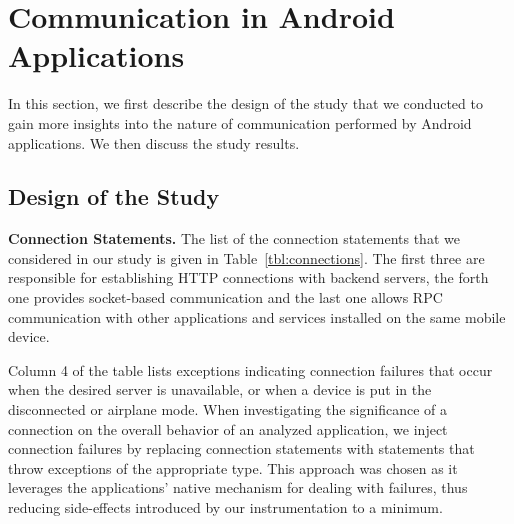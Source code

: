 \section{Communication in Android Applications}
\label{sec:study} 

In this section, we first describe the design of the study that we conducted to gain more insights into the nature of communication performed by Android applications. We then discuss the study results. 

\subsection{Design of the Study}

\vspace{0.1in}
\noindent 
{\bf Connection Statements.}
The list of the connection statements that we considered in our study is given in Table~\ref{tbl:connections}.
The first three are responsible for establishing HTTP connections with backend servers, the forth one provides socket-based communication and the last one allows 
RPC communication with other applications and services installed on the same mobile device. 

\begin{table}[t]
\caption{Considered Connection Statements.}
\label{tbl:connections}
\centering
\tabcolsep=1.5pt
\end{table}

Column 4 of the table lists exceptions indicating connection failures that occur when the desired server is unavailable, or when a device is put in the disconnected or airplane mode. 
When investigating the significance of a connection on the overall behavior of an analyzed application, we inject connection failures by replacing connection statements with statements that throw exceptions of the appropriate type. 
This approach was chosen as it leverages the applications' native mechanism for dealing with failures, thus reducing side-effects introduced by our instrumentation to a minimum.

